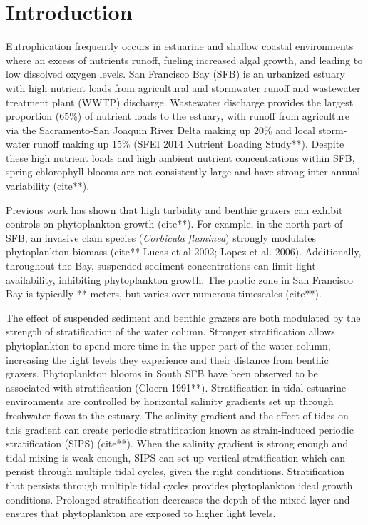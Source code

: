 \documentclass[preprint,review,12pt]{elsarticle}
\begin{document}
\section{Introduction}\label{S:intro}
Eutrophication frequently occurs in estuarine and shallow coastal environments where an excess of nutrients runoff, fueling increased algal growth, and leading to low dissolved oxygen levels. San Francisco Bay (SFB) is an urbanized estuary with high nutrient loads from agricultural and stormwater runoff and wastewater treatment plant (WWTP) discharge. Wastewater discharge provides the largest proportion (65\%) of nutrient loads to the estuary, with runoff from agriculture via the Sacramento-San Joaquin River Delta making up 20\% and local storm-water runoff making up 15\% (SFEI 2014 Nutrient Loading Study**). Despite these high nutrient loads and high ambient nutrient concentrations within SFB, spring chlorophyll blooms are not consistently large and have strong inter-annual variability (cite**). 

Previous work has shown that high turbidity and benthic grazers can exhibit controls on phytoplankton growth (cite**). For example, in the north part of SFB, an invasive clam species (\textit{Corbicula fluminea}) strongly modulates phytoplankton biomass (cite** Lucas et al 2002; Lopez et al. 2006). Additionally, throughout the Bay, suspended sediment concentrations can limit light availability, inhibiting phytoplankton growth. The photic zone in San Francisco Bay is typically ** meters, but varies over numerous timescales (cite**).  

The effect of suspended sediment and benthic grazers are both modulated by the strength of stratification of the water column. Stronger stratification allows phytoplankton to spend more time in the upper part of the water column, increasing the light levels they experience and their distance from benthic grazers. Phytoplankton blooms in South SFB have been observed to be associated with stratification (Cloern 1991**). Stratification in tidal estuarine environments are controlled by horizontal salinity gradients set up through freshwater flows to the estuary. The salinity gradient and the effect of tides on this gradient can create periodic stratification known as strain-induced periodic stratification (SIPS) (cite**). When the salinity gradient is strong enough and tidal mixing is weak enough, SIPS can set up vertical stratification which can persist through multiple tidal cycles, given the right conditions. Stratification that persists through multiple tidal cycles provides phytoplankton ideal growth conditions. Prolonged stratification decreases the depth of the mixed layer and ensures that phytoplankton are exposed to higher light levels. 
\end{document}
